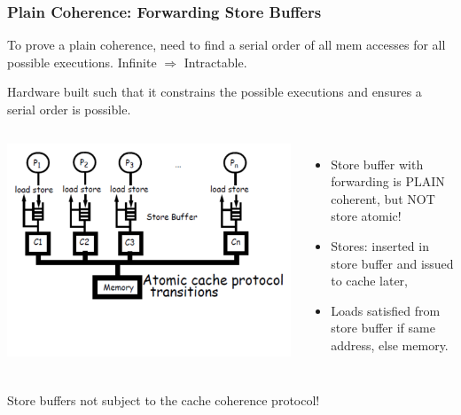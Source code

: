 \documentclass{beamer}
\renewcommand{\emph}[1]{\textcolor{structure}{#1}}
\newcommand{\emp}[1]{\textcolor{DikuRed}{ #1}}
\begin{document}
\begin{frame}[fragile,t]
\frametitle{Plain Coherence: Forwarding Store Buffers}

To prove a plain coherence, need to find a serial order of all mem accesses for 
all possible executions. Infinite $\Rightarrow$ Intractable.\medskip

\emph{Hardware built such that it constrains the possible executions and ensures 
a serial order is possible}.

\begin{columns}
\includegraphics[width=44ex]{Ch7Figs/FwdStoreBuff}%
\vspace{-6ex}
\begin{itemize}
    \item \emp{Store buffer with forwarding is PLAIN coherent, but NOT store atomic!}
    \item Stores: inserted in store buffer and issued to cache later,
    \item Loads satisfied from store buffer if same address, else memory.
\end{itemize}
\end{columns}
\vspace{-3ex}
\alert{Store buffers not subject to the cache coherence protocol!}

\end{frame}
\end{document}
